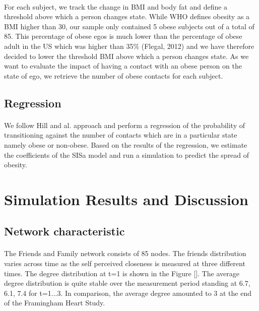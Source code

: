 \documentclass[11pt]{article}
\begin{document}
\paragraph{}
For each subject, we track the change in BMI and body fat and define a threshold above which a person changes state. While WHO defines obesity as a BMI higher than 30, our sample only contained 5 obese subjects out of a total of 85. This percentage of obese egos is much lower than the percentage of obese adult in the US which was higher than 35\% (Flegal, 2012) and we have therefore decided to lower the threshold BMI above which a person changes state. As we want to evaluate the impact of having a contact with an obese person  on the state of ego, we retrieve the number of obese contacts for each subject.

\subsection{Regression}
\paragraph{}
We follow Hill and al. approach and perform a regression of the probability of transitioning against the number of contacts which are in a particular state namely obese or non-obese. Based on the results of the regression, we estimate the coefficients of the SISa model and run a simulation to predict the spread of obesity.

\section{Simulation Results and Discussion}

\subsection{Network characteristic}
\paragraph{}
The Friends and Family network consists of 85 nodes. The friends distribution varies across time as the self perceived closeness is measured at three different times. The degree distribution at t=1 is shown in the Figure []. The average degree distribution is quite stable over the measurement period standing at 6.7, 6.1, 7.4 for t=1...3. In comparison, the average degree amounted to 3 at the end of the Framingham Heart Study.
\end{document}
